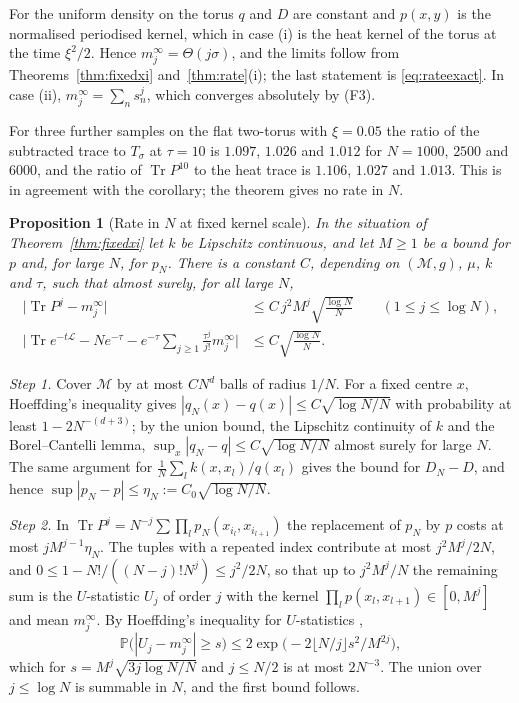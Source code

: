 \documentclass[11pt,a4paper]{article}
\makeatletter
\theoremstyle{stmt}
\newtheorem{proposition}[theorem]{Proposition}
\theoremstyle{defn}
\theoremstyle{rmk}
\renewenvironment{proof}[1][\proofname]{\par\pushQED{\qed}\normalfont\topsep6\p@\@plus6\p@\relax
  \trivlist\item[\hskip\labelsep{\sffamily\itshape\small #1.}]\ignorespaces}{\popQED\endtrivlist\@endpefalse}
\numberwithin{equation}{section}
\DeclareMathOperator{\Tr}{Tr}
\newcommand{\M}{\mathcal{M}}
\newcommand{\Lc}{\mathcal{L}}
\makeatother
\begin{document}
{\begin{proof}
For the uniform density on the torus $q$ and $D$ are constant and $p(x,y)$ is the normalised periodised kernel, which in case (i) is the heat kernel of the torus at the time $\xi^2/2$. Hence $m_j^\infty=\Theta(j\sigma)$, and the limits follow from Theorems~\ref{thm:fixedxi} and~\ref{thm:rate}(i); the last statement is \eqref{eq:rateexact}. In case (ii), $m_j^\infty=\sum_ns_n^j$, which converges absolutely by (F3).
\end{proof}

For three further samples on the flat two-torus with $\xi=0.05$ the ratio of the subtracted trace to $T_\sigma$ at $\tau=10$ is $1.097$, $1.026$ and $1.012$ for $N=1000$, $2500$ and $6000$, and the ratio of $\Tr P^{10}$ to the heat trace is $1.106$, $1.027$ and $1.013$. This is in agreement with the corollary; the theorem gives no rate in $N$.

\begin{proposition}[Rate in $N$ at fixed kernel scale]\label{prop:rateN}
In the situation of Theorem~\ref{thm:fixedxi} let $k$ be Lipschitz continuous, and let $M\ge1$ be a bound for $p$ and, for large $N$, for $p_N$. There is a constant $C$, depending on $(\M,g)$, $\mu$, $k$ and $\tau$, such that almost surely, for all large $N$,
\begin{align*}
\big|\Tr P^j-m_j^\infty\big|&\le C\,j^2M^j\sqrt{\frac{\log N}{N}}\qquad(1\le j\le\log N),\\
\Big|\Tr e^{-t\Lc}-Ne^{-\tau}-e^{-\tau}\sum_{j\ge1}\frac{\tau^j}{j!}m_j^\infty\Big|&\le C\sqrt{\frac{\log N}{N}} .
\end{align*}
\end{proposition}

\begin{proof}
\emph{Step 1.} Cover $\M$ by at most $CN^d$ balls of radius $1/N$. For a fixed centre $x$, Hoeffding's inequality \cite{Hoeffding} gives $|q_N(x)-q(x)|\le C\sqrt{\log N/N}$ with probability at least $1-2N^{-(d+3)}$; by the union bound, the Lipschitz continuity of $k$ and the Borel--Cantelli lemma, $\sup_x|q_N-q|\le C\sqrt{\log N/N}$ almost surely for large $N$. The same argument for $\frac1N\sum_lk(x,x_l)/q(x_l)$ gives the bound for $D_N-D$, and hence $\sup|p_N-p|\le\eta_N:=C_0\sqrt{\log N/N}$.

\emph{Step 2.} In $\Tr P^j=N^{-j}\sum\prod_lp_N(x_{i_l},x_{i_{l+1}})$ the replacement of $p_N$ by $p$ costs at most $jM^{j-1}\eta_N$. The tuples with a repeated index contribute at most $j^2M^j/2N$, and $0\le1-N!/((N-j)!N^j)\le j^2/2N$, so that up to $j^2M^j/N$ the remaining sum is the $U$-statistic $U_j$ of order $j$ with the kernel $\prod_lp(x_l,x_{l+1})\in[0,M^j]$ and mean $m_j^\infty$. By Hoeffding's inequality for $U$-statistics \cite[Section~5a, inequality~(5.7)]{Hoeffding},
\[
\mathbb P\big(|U_j-m_j^\infty|\ge s\big)\le2\exp\!\big(-2\lfloor N/j\rfloor s^2/M^{2j}\big),
\]
which for $s=M^j\sqrt{3j\log N/N}$ and $j\le N/2$ is at most $2N^{-3}$. The union over $j\le\log N$ is summable in $N$, and the first bound follows.


\end{proof}}
\end{document}

